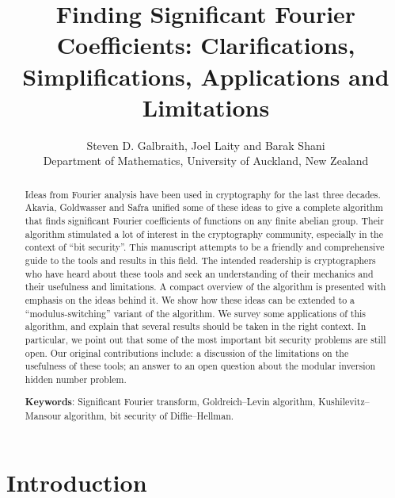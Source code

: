 \documentclass[11pt]{article}
\theoremstyle{definition}
\begin{document}
\pagestyle{plain} %
\lineskip=1.8pt\baselineskip=18pt\lineskiplimit=0pt %

\title{Finding Significant Fourier Coefficients: Clarifications, Simplifications, Applications and Limitations}

\author{Steven D. Galbraith, Joel Laity and Barak Shani \\ \small{Department of Mathematics, University of Auckland, New Zealand}}
\date{}
\maketitle

\begin{abstract}
    Ideas from Fourier analysis have been used in cryptography for the last three decades. Akavia, Goldwasser and Safra unified some of these ideas to give a complete algorithm that finds significant Fourier coefficients of functions on any finite abelian group. Their algorithm stimulated a lot of interest in the cryptography community, especially in the context of ``bit security''. This manuscript attempts to be a friendly and comprehensive guide to the tools and results in this field.
    The intended readership is cryptographers who have heard about these tools and seek an understanding of their mechanics and their usefulness and limitations.
    A compact overview of the algorithm is presented with emphasis on the ideas behind it. We show how these ideas can be extended to a ``modulus-switching'' variant of the algorithm. We survey some applications of this algorithm, and explain that several results should be taken in the right context. In particular, we point out that some of the most important bit security problems are still open. Our original contributions include: a discussion of the limitations on the usefulness of these tools; an answer to an open question about the modular inversion hidden number problem.

    \bigskip
    \noindent \textbf{Keywords}: Significant Fourier transform, Goldreich--Levin algorithm, Kushilevitz--Mansour algorithm, bit security of Diffie--Hellman.
\end{abstract}

\newpage
\tableofcontents
\lineskip=1.8pt\baselineskip=18pt\lineskiplimit=0pt %

\section{Introduction}
\end{document}
